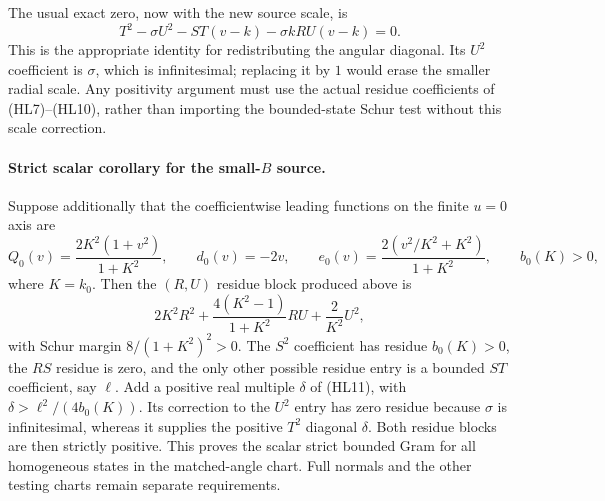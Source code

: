 The usual exact zero, now with the new source scale, is
\[
 T^2-\sigma U^2-ST(v-k)-\sigma kRU(v-k)=0.          \tag{HL11}
\]
This is the appropriate identity for redistributing the angular
diagonal.  Its $U^2$ coefficient is $\sigma$, which is infinitesimal;
replacing it by $1$ would erase the smaller radial scale.  Any
positivity argument must use the actual residue coefficients of
(HL7)--(HL10), rather than importing the bounded-state Schur test
without this scale correction.

\paragraph{Strict scalar corollary for the small-$B$ source.}
Suppose additionally that the coefficientwise leading functions on
the finite $u=0$ axis are
\[
 Q_0(v)=\frac{2K^2(1+v^2)}{1+K^2},\qquad
 d_0(v)=-2v,\qquad
 e_0(v)=\frac{2(v^2/K^2+K^2)}{1+K^2},
 \qquad b_0(K)>0,
\]
where $K=k_0$.  Then the $(R,U)$ residue block produced above is
\[
 2K^2R^2+\frac{4(K^2-1)}{1+K^2}RU+\frac2{K^2}U^2,
\]
with Schur margin $8/(1+K^2)^2>0$.  The $S^2$ coefficient has
residue $b_0(K)>0$, the $RS$ residue is zero, and the only other
possible residue entry is a bounded $ST$ coefficient, say $\ell$.
Add a positive real multiple $\delta$ of (HL11), with
$\delta>\ell^2/(4b_0(K))$.  Its correction to the $U^2$ entry has
zero residue because $\sigma$ is infinitesimal, whereas it supplies
the positive $T^2$ diagonal $\delta$.  Both residue blocks are then
strictly positive.  This proves the scalar strict bounded Gram for
all homogeneous states in the matched-angle chart.  Full normals
and the other testing charts remain separate requirements.
